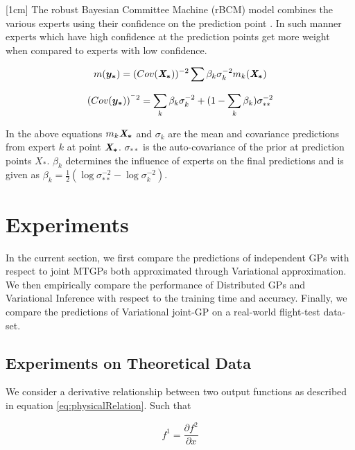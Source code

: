 [1cm]
The robust Bayesian Committee Machine (rBCM) model combines the various experts using their confidence on the prediction point \cite{deisenroth2015distributed}. In such manner experts which have high confidence at the prediction points get more weight when compared to experts with low confidence. 

\begin{equation}\label{eq:meanDGP}
    m(\boldsymbol{y_{*}}) = (Cov(\bm{\mathit{X_{*}}}))^{-2}\sum \beta_{k}\sigma_{k}^{-2}m_{k}(\bm{\mathit{X_{*}}})
\end{equation}

\begin{equation}
    (Cov(\boldsymbol{y_{*}}))^{^-2} = \sum_{k} \beta_{k}\sigma_{k}^{-2} + (1- \sum_{k} \beta_{k})\sigma^{-2}_{**}
\end{equation}

In the above equations \(m_{k}\bm{\mathit{X_{*}}}\) and \(\sigma_{k}\) are the mean and covariance predictions from expert \(k\) at point \(\bm{\mathit{X_{*}}}\). \(\sigma_{**}\) is the auto-covariance of the prior at prediction points \(X_{*}\). \(\beta_{k}\) determines the influence of experts on the final predictions \cite{caoF14} and is given as \(\beta_{k} = \frac{1}{2}(\log\sigma_{**}^{-2} - \log\sigma_{k}^{-2})\).  

\section{Experiments}\label{sec:experiments}
In the current section, we first compare the predictions of independent GPs with respect to joint MTGPs both approximated through Variational approximation. We then empirically compare the performance of Distributed GPs and Variational Inference with respect to the training time and accuracy. Finally, we compare the predictions of Variational joint-GP on a real-world flight-test data-set. 

\subsection{Experiments on Theoretical Data}\label{sub:ScaleexperimentsSyntheticData}
We consider a derivative relationship between two output functions as described in equation \ref{eq:physicalRelation}. Such that 

\begin{equation}\label{eq:derivativeEquation}
   f^1 = \frac{\partial f^2}{\partial x} 
\end{equation}

